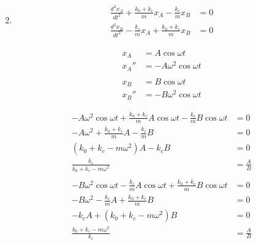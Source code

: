 \documentclass{article}
\begin{document}
\setcounter{subsection}{6}
\subsection{}

\begin{enumerate}
  \setcounter{enumi}{1}
  \item

        \begin{align*}
          \frac{d^2 x_A}{d t^2} + \frac{k_0 + k_c}{m} x_A - \frac{k_c}{m} x_B & = 0 \\
          \frac{d^2 x_B}{d t^2} - \frac{k_c}{m} x_A + \frac{k_0 + k_c}{m} x_B & = 0
        \end{align*}

        \begin{align*}
          x_A   & = A \cos \omega t           \\
          x_A'' & = -A \omega^2 \cos \omega t \\ \\
          x_B   & = B \cos \omega t           \\
          x_B'' & = -B \omega^2 \cos \omega t
        \end{align*}

        \begin{align*}
          -A \omega^2 \cos \omega t + \frac{k_0 + k_c}{m} A \cos \omega t - \frac{k_c}{m} B \cos \omega t & = 0           \\
          -A \omega^2 + \frac{k_0 + k_c}{m} A - \frac{k_c}{m} B                                           & = 0           \\
          (k_0 + k_c - m \omega^2) A - k_c B                                                              & = 0           \\
          \frac{k_c}{k_0 + k_c - m \omega^2}                                                              & = \frac{A}{B} \\ \\
          -B \omega^2 \cos \omega t - \frac{k_c}{m} A \cos \omega t + \frac{k_0 + k_c}{m} B \cos \omega t & = 0           \\
          -B \omega^2 - \frac{k_c}{m} A + \frac{k_0 + k_c}{m} B                                           & = 0           \\
          -k_c A + (k_0 + k_c - m \omega^2) B                                                             & = 0           \\
          \frac{k_0 + k_c - m \omega^2}{k_c}                                                              & = \frac{A}{B}
        \end{align*}


\end{enumerate}
\end{document}
